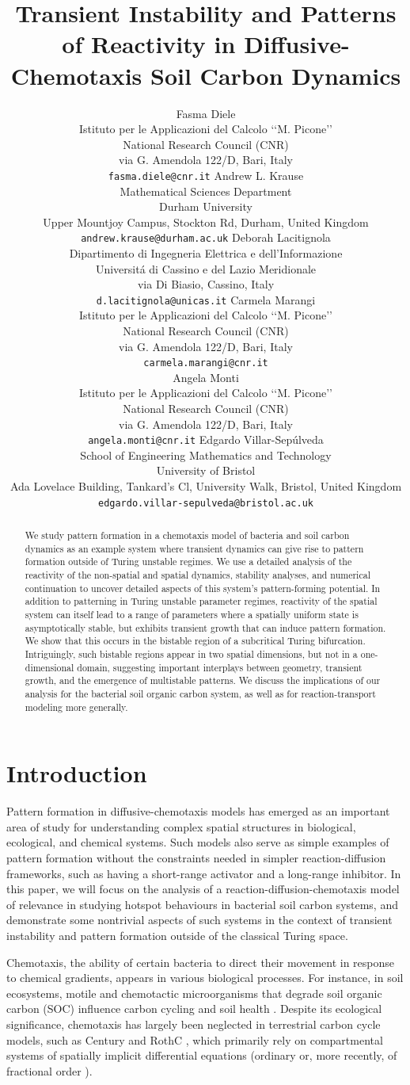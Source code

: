 \documentclass{article}
\title{Transient Instability and Patterns of Reactivity in Diffusive-Chemotaxis  Soil Carbon Dynamics}
\author{Fasma Diele \\
  Istituto per le Applicazioni del Calcolo \lq \lq M. Picone\rq \rq\\
  National Research Council (CNR)\\
  via G. Amendola 122/D, Bari, Italy\\
  \texttt{fasma.diele@cnr.it}
  \And
  Andrew L. Krause \\
  Mathematical Sciences Department \\
  Durham University\\
  Upper Mountjoy Campus, Stockton Rd, Durham, United Kingdom\\
  \texttt{andrew.krause@durham.ac.uk}
  \And
  Deborah Lacitignola \\
  Dipartimento di Ingegneria Elettrica e dell'Informazione\\
  Universit\'a di Cassino e del Lazio Meridionale\\
  via Di Biasio, Cassino, Italy\\
  \texttt{d.lacitignola@unicas.it}
   \And
 Carmela Marangi \\
  Istituto per le Applicazioni del Calcolo \lq \lq M. Picone\rq \rq\\
  National Research Council (CNR)\\
  via G. Amendola 122/D, Bari, Italy\\
  \texttt{carmela.marangi@cnr.it} \\
  \And
 Angela Monti \\
  Istituto per le Applicazioni del Calcolo \lq \lq M. Picone\rq \rq \\
  National Research Council (CNR)\\
  via G. Amendola 122/D, Bari, Italy\\
  \texttt{angela.monti@cnr.it} 
  \And
  Edgardo Villar-Sep\'ulveda \\
  School of Engineering Mathematics and Technology \\
  University of Bristol \\
  Ada Lovelace Building, Tankard’s Cl, University Walk, Bristol, United Kingdom\\
  \texttt{edgardo.villar-sepulveda@bristol.ac.uk}
}
\begin{document}
\maketitle

\begin{abstract}
We study pattern formation in a chemotaxis model of bacteria and soil carbon dynamics as an example system where transient dynamics can give rise to pattern formation outside of Turing unstable regimes. We use a detailed analysis of the reactivity of the non-spatial and spatial dynamics, stability analyses, and numerical continuation to uncover detailed aspects of this system's pattern-forming potential. In addition to patterning in Turing unstable parameter regimes, reactivity of the spatial system can itself lead to a range of parameters where a spatially uniform state is asymptotically stable, but exhibits transient growth that can induce pattern formation. We show that this occurs in the bistable region of a subcritical Turing bifurcation. Intriguingly, such bistable regions appear in two spatial dimensions, but not in a one-dimensional domain, suggesting important interplays between geometry, transient growth, and the emergence of multistable patterns. We discuss the implications of our analysis for the bacterial soil organic carbon system, as well as for reaction-transport modeling more generally.
\end{abstract}

\section{Introduction}

Pattern formation in diffusive-chemotaxis models has emerged as an important area of study for understanding complex spatial structures in biological, ecological, and chemical systems. Such models also serve as simple examples of pattern formation without the constraints needed in simpler reaction-diffusion frameworks, such as having a short-range activator and a long-range inhibitor. In this paper, we will focus on the analysis of a reaction-diffusion-chemotaxis model of relevance in studying hotspot behaviours in bacterial soil carbon systems, and demonstrate some nontrivial aspects of such systems in the context of transient instability and pattern formation outside of the classical Turing space.

Chemotaxis, the ability of certain bacteria to direct their movement in response to chemical gradients, appears in various biological processes. For instance, in soil ecosystems, motile and chemotactic microorganisms that degrade soil organic carbon (SOC) influence carbon cycling and soil health \cite{vogel2014submicron}. Despite its ecological significance, chemotaxis has largely been neglected in terrestrial carbon cycle models, such as Century \cite{parton1996century} and RothC \cite{coleman1997simulating}, which primarily rely on compartmental systems of spatially implicit differential equations (ordinary or, more recently, of fractional order \cite{bohaienko2023novel}).
\end{document}
